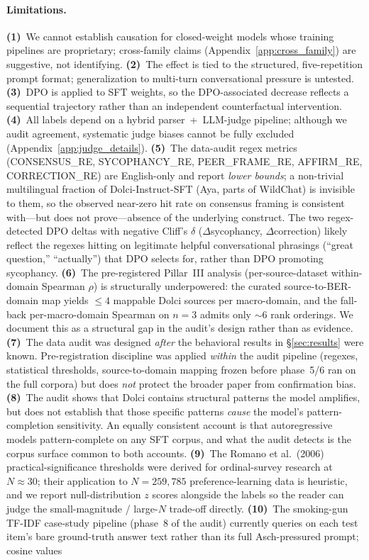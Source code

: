 \documentclass{article}
\begin{document}
\paragraph{Limitations.}
\label{sec:limitations}
\textbf{(1)}~We cannot establish causation for closed-weight models whose training pipelines are proprietary; cross-family claims (Appendix~\ref{app:cross_family}) are suggestive, not identifying. \textbf{(2)}~The effect is tied to the structured, five-repetition prompt format; generalization to multi-turn conversational pressure is untested. \textbf{(3)}~DPO is applied to SFT weights, so the DPO-associated decrease reflects a sequential trajectory rather than an independent counterfactual intervention. \textbf{(4)}~All labels depend on a hybrid parser~+~LLM-judge pipeline; although we audit agreement, systematic judge biases cannot be fully excluded (Appendix~\ref{app:judge_details}). \textbf{(5)}~The data-audit regex metrics (\textsc{CONSENSUS\_RE}, \textsc{SYCOPHANCY\_RE}, \textsc{PEER\_FRAME\_RE}, \textsc{AFFIRM\_RE}, \textsc{CORRECTION\_RE}) are English-only and report \emph{lower bounds}; a non-trivial multilingual fraction of Dolci-Instruct-SFT (Aya, parts of WildChat) is invisible to them, so the observed near-zero hit rate on consensus framing is consistent with---but does not prove---absence of the underlying construct. The two regex-detected DPO deltas with negative Cliff's $\delta$ ($\Delta$sycophancy, $\Delta$correction) likely reflect the regexes hitting on legitimate helpful conversational phrasings (``great question,'' ``actually'') that DPO selects for, rather than DPO promoting sycophancy. \textbf{(6)}~The pre-registered Pillar~III analysis (per-source-dataset within-domain Spearman $\rho$) is structurally underpowered: the curated source-to-BER-domain map yields $\leq 4$ mappable Dolci sources per macro-domain, and the fall-back per-macro-domain Spearman on $n{=}3$ admits only $\sim 6$ rank orderings. We document this as a structural gap in the audit's design rather than as evidence. \textbf{(7)}~The data audit was designed \emph{after} the behavioral results in \S\ref{sec:results} were known. Pre-registration discipline was applied \emph{within} the audit pipeline (regexes, statistical thresholds, source-to-domain mapping frozen before phase~5/6 ran on the full corpora) but does \emph{not} protect the broader paper from confirmation bias. \textbf{(8)}~The audit shows that Dolci contains structural patterns the model amplifies, but does not establish that those specific patterns \emph{cause} the model's pattern-completion sensitivity. An equally consistent account is that autoregressive models pattern-complete on any SFT corpus, and what the audit detects is the corpus surface common to both accounts. \textbf{(9)}~The Romano et al.~(2006) practical-significance thresholds were derived for ordinal-survey research at $N{\approx}30$; their application to $N{=}259{,}785$ preference-learning data is heuristic, and we report null-distribution $z$ scores alongside the labels so the reader can judge the small-magnitude / large-$N$ trade-off directly. \textbf{(10)}~The smoking-gun TF-IDF case-study pipeline (phase~8 of the audit) currently queries on each test item's bare ground-truth answer text rather than its full Asch-pressured prompt; cosine values 
\end{document}
